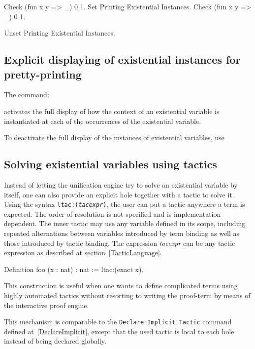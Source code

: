 \begin{coq_example}
Check (fun x y => _) 0 1.
Set Printing Existential Instances.
Check (fun x y => _) 0 1.
\end{coq_example}

\begin{coq_eval}
Unset Printing Existential Instances.
\end{coq_eval}

\subsection{Explicit displaying of existential instances for pretty-printing
\label{SetPrintingExistentialInstances}
}

The command:
\begin{quote}
{}
\end{quote}
activates the full display of how the context of an existential variable is
instantiated at each of the occurrences of the existential variable.

To deactivate the full display of the instances of existential
variables, use
\begin{quote}
{}
\end{quote}

\subsection{Solving existential variables using tactics}

\def\expr{\textrm{\textsl{tacexpr}}}

Instead of letting the unification engine try to solve an existential variable
by itself, one can also provide an explicit hole together with a tactic to solve
it. Using the syntax {\tt ltac:(\expr)}, the user can put a
tactic anywhere a term is expected. The order of resolution is not specified and
is implementation-dependent. The inner tactic may use any variable defined in
its scope, including repeated alternations between variables introduced by term
binding as well as those introduced by tactic binding. The expression {\expr}
can be any tactic expression as described at section~\ref{TacticLanguage}.

\begin{coq_example*}
Definition foo (x : nat) : nat := ltac:(exact x).
\end{coq_example*}

This construction is useful when one wants to define complicated terms using
highly automated tactics without resorting to writing the proof-term by means of
the interactive proof engine.

This mechanism is comparable to the {\tt Declare Implicit Tactic} command
defined at~\ref{DeclareImplicit}, except that the used tactic is local to each
hole instead of being declared globally.

